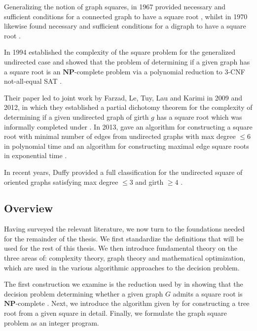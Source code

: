 \documentclass[11pt]{report}
\begin{document}
Generalizing the notion of graph squares, in 1967 \citeauthor{mukhopadhyay_1967_root} provided necessary and sufficient conditions for a connected graph to have a square root \cite{mukhopadhyay_1967_root}, whilst \citeauthor{geller_1970_root} in 1970 likewise found necessary and sufficient conditions for a digraph to have a square root \cite{geller_1970_root}. 

In 1994 \citeauthor{motwani_sudan_1994_roots} established the complexity of the square problem for the generalized undirected case and showed that the problem of determining if a given graph has a square root is an $\mathbf{NP}$-complete problem via a polynomial reduction to $3$-CNF not-all-equal SAT \cite{motwani_sudan_1994_roots}.

Their paper led to joint work by Farzad, Le, Tuy, Lau and Karimi in 2009 and 2012, in which they established a partial dichotomy theorem for the complexity of determining if a given undirected graph of girth $g$ has a square root \cite{farzad_2009_roots} which was informally completed under \cite{farzad_karimi_2012_root}. In 2013, \citeauthor{cochefert_et_al_2013_sparse_square_roots} gave an algorithm for constructing a square root with minimal number of edges from undirected graphs with max degree $\leq 6$ in polynomial time and an algorithm for constructing maximal edge square roots in exponential time \cite{cochefert_et_al_2013_sparse_square_roots}. 

In recent years, Duffy provided a full classification for the undirected square of oriented graphs satisfying max degree $\leq 3$ and girth $\geq 4$ \cite{duffy_2025_oriented_root}. 

\subsection{Overview} \label{subsec::overview}
Having surveyed the relevant literature, we now turn to the foundations needed for the remainder of the thesis. We first standardize the definitions that will be used for the rest of this thesis. We then introduce fundamental theory on the three areas of: complexity theory, graph theory and mathematical optimization, which are used in the various algorithmic approaches to the decision problem. 

The first construction we examine is the reduction used by \citeauthor{motwani_sudan_1994_roots} in showing that the decision problem determining whether a given graph $G$ admits a square root is $\mathbf{NP}$-complete \cite{motwani_sudan_1994_roots}. Next, we introduce the  algorithm given by \citeauthor{ross_1960_square} for constructing a tree root from a given square in detail. Finally, we formulate the graph square problem as an integer program. 
\end{document}
